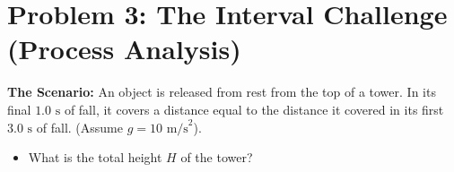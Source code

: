 \documentclass[11pt]{article}
\begin{document}
\section*{Problem 3: The Interval Challenge (Process Analysis)}
\textbf{The Scenario:} An object is released from rest from the top of a tower. In its final $1.0 \text{ s}$ of fall, it covers a distance equal to the distance it covered in its first $3.0 \text{ s}$ of fall. (Assume $g = 10 \text{ m/s}^2$).

\begin{itemize}
    \item[(a)] What is the total height $H$ of the tower?
\end{itemize}
\end{document}
